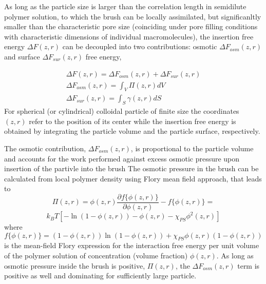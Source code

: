 \documentclass[12pt, a4paper]{article}
\begin{document}
As long as the particle size is larger than the correlation length in semidilute polymer solution, to which the brush can be locally assimilated, but significanltly smaller than the characteristic 
pore size (coinciding under pore filling conditions with characteristic dimensions of individual macromolecules), 
the insertion free energy $\Delta F(z,r)$ can be decoupled into two contributions: osmotic $\Delta F_{osm}(z,r)$ and surface $\Delta F_{sur}(z,r)$ free energy,

\begin{eqnarray}
    \Delta F (z,r)= \Delta F_{osm}(z,r) + \Delta F_{sur}(z,r)
    \\
    \Delta F_{osm}(z,r) = \int_{V} \Pi(z,r) dV
    \\
    \Delta F_{sur}(z,r) = \int_{S} \gamma (z,r) dS
\label{Delta_F}
\end{eqnarray}
For spherical (or cylindrical) colloidal particle of finite size the coordinates $(z,r)$ refer to the position of its center while the insertion 
free energy is obtained by integrating the particle volume and the particle surface, respectively.

The osmotic contribution, $\Delta F_{osm}(z,r)$, is proportional to the particle volume and accounts for the work performed against excess osmotic pressure upon insertion of the partivle into the brush
The osmotic pressure in the brush can be calculated from local polymer density using Flory mean field approach, that leads to 
$$
\Pi(z,r)=  \phi(z,r)\frac{\partial f\{\phi(z,r)\}}{\partial \phi(z,r)} - f\{\phi(z,r)\}= 
$$
\begin{equation}
	k_BT[-\ln(1-\phi(z,r)) - \phi(z,r) -\chi_{PS}\phi^2(z,r)]
\end{equation}
where
$$
f\{\phi(z,r)\}=(1-\phi(z,r))\ln(1-\phi(z,r)) +\chi_{PS}\phi(z,r)(1-\phi(z,r))
$$
is the mean-field Flory expression for the interaction free energy per unit volume of the polymer solution of concentration (volume fraction) $\phi(z,r)$.
As long as osmotic pressure inside the brush is positive, $\Pi(z,r)$, the $\Delta F_{osm}(z,r)$ term is positive as well and dominating for sufficiently large particle. 
\end{document}
